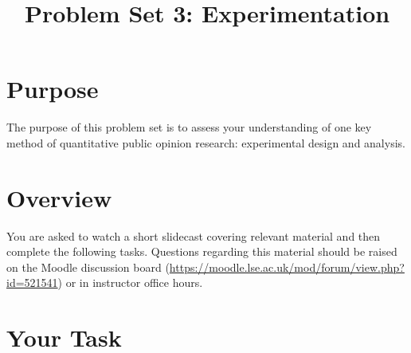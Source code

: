 \documentclass[a4paper]{exam}
\title{Problem Set 3: Experimentation}
\date{}
\begin{document}
\vspace{-4em}
\maketitle

\section{Purpose}\label{purpose}

The purpose of this problem set is to assess your understanding of one key method of quantitative public opinion research: experimental design and analysis.

\section{Overview}\label{overview}

You are asked to watch a short slidecast covering relevant material and then complete the following tasks. Questions regarding this material should be raised on the Moodle discussion board (\url{https://moodle.lse.ac.uk/mod/forum/view.php?id=521541}) or in instructor office hours.

\section{Your Task}\label{your-task}
\end{document}

